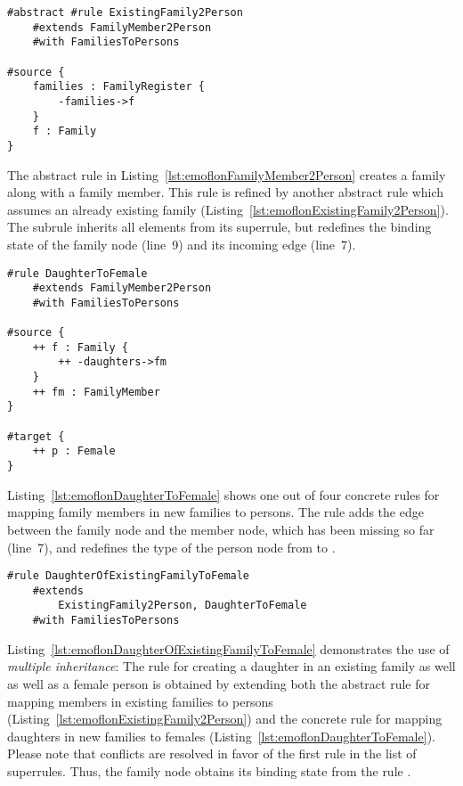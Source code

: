 \begin{lstlisting}[label={lst:emoflonExistingFamily2Person}, float=htb!, language=emoflon, caption={Mapping members in existing families to persons}]
#abstract #rule ExistingFamily2Person 
    #extends FamilyMember2Person 
    #with FamiliesToPersons

#source { 
    families : FamilyRegister {
        -families->f
    }
    f : Family
}
\end{lstlisting}

The abstract rule in Listing~\ref{lst:emoflonFamilyMember2Person} creates a family along with a family member. This rule is refined by another abstract rule which assumes an already  existing family (Listing~\ref{lst:emoflonExistingFamily2Person}). The subrule inherits all elements from its superrule, but redefines the binding state of the family node (line~9) and its incoming edge (line~7).

\begin{lstlisting}[label={lst:emoflonDaughterToFemale}, float=htb!, language=emoflon, caption={Mapping daughters to female persons}]
#rule DaughterToFemale 
    #extends FamilyMember2Person 
    #with FamiliesToPersons

#source { 
    ++ f : Family {
        ++ -daughters->fm
    }
    ++ fm : FamilyMember
}

#target {
    ++ p : Female
}
\end{lstlisting}

Listing~\ref{lst:emoflonDaughterToFemale} shows one out of four concrete rules for mapping family members in new families to persons. The rule adds the edge between the family node and the member node, which has been missing so far (line~7), and redefines the type of the person node from  to .

\begin{lstlisting}[label={lst:emoflonDaughterOfExistingFamilyToFemale}, float=htb!, language=emoflon, caption={Mapping daughters in existing families to female persons}]
#rule DaughterOfExistingFamilyToFemale 
    #extends 
        ExistingFamily2Person, DaughterToFemale 
    #with FamiliesToPersons
\end{lstlisting}

Listing~\ref{lst:emoflonDaughterOfExistingFamilyToFemale} demonstrates the use of \emph{multiple inheritance}: The rule for creating a daughter in an existing family as well as well as a female person is obtained by extending both the abstract rule for mapping members in existing families to persons (Listing~\ref{lst:emoflonExistingFamily2Person}) and the concrete rule for mapping daughters in new families to females (Listing~\ref{lst:emoflonDaughterToFemale}). Please note that conflicts are resolved in favor of the first rule in the list of superrules. Thus, the family node  obtains its binding state from the rule .

